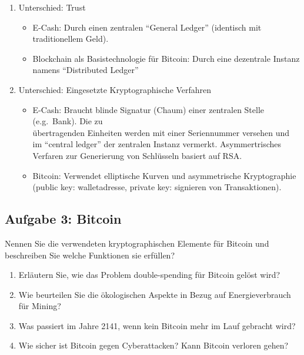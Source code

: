 \documentclass[11pt]{article}
\providecommand{\tightlist}{%
      \setlength{\itemsep}{0pt}\setlength{\parskip}{0pt}}
\begin{document}
\begin{enumerate}
\def\labelenumi{\arabic{enumi}.}
\item
  Unterschied: Trust

  \begin{itemize}
  \item
    E-Cash: Durch einen zentralen ``General Ledger'' (identisch mit
    traditionellem Geld).
  \item
    Blockchain als Basistechnologie für Bitcoin: Durch eine dezentrale
    Instanz namens ``Distributed Ledger''
  \end{itemize}
\item
  Unterschied: Eingesetzte Kryptographische Verfahren

  \begin{itemize}
  \item
    E-Cash: Braucht blinde Signatur (Chaum) einer zentralen Stelle
    (e.g.~Bank). Die zu\\
    übertragenden Einheiten werden mit einer Seriennummer versehen und
    im ``central ledger'' der 
    zentralen Instanz vermerkt. Asymmertrisches Verfaren zur Generierung
    von Schlüsseln basiert auf RSA.
  \item
    Bitcoin: Verwendet elliptische Kurven und asymmetrische
    Kryptographie (public key: walletadresse, 
    private key: signieren von Transaktionen).
  \end{itemize}
\end{enumerate}

    \hypertarget{aufgabe-3-bitcoin}{%
\subsection{Aufgabe 3: Bitcoin}\label{aufgabe-3-bitcoin}}

Nennen Sie die verwendeten kryptographischen Elemente für Bitcoin und
beschreiben Sie welche Funktionen sie erfüllen?

\begin{enumerate}
\def\labelenumi{\alph{enumi})}
\tightlist
\item
  Erläutern Sie, wie das Problem double-spending für Bitcoin gelöst
  wird?\\
\item
  Wie beurteilen Sie die ökologischen Aspekte in Bezug auf
  Energieverbrauch für Mining?\\
\item
  Was passiert im Jahre 2141, wenn kein Bitcoin mehr im Lauf gebracht
  wird?\\
\item
  Wie sicher ist Bitcoin gegen Cyberattacken? Kann Bitcoin verloren
  gehen?
\end{enumerate}
\end{document}
